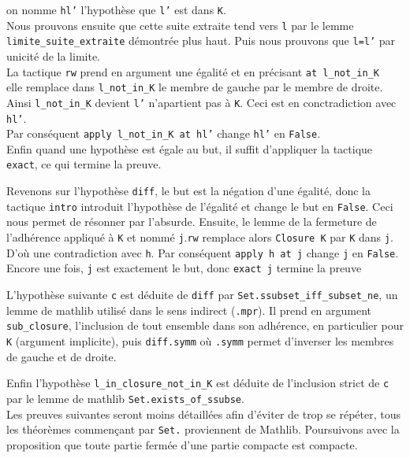 \documentclass[a4paper, 12pt]{article}
\newcommand{\lean}[1]{\texttt{#1}}
\begin{document}
\begin{itemize}[itemsep=30pt]
    on nomme \lean{hl'} l'hypothèse que \lean{l'} est dans \lean{K}.\\
    Nous prouvons ensuite que cette suite extraite tend vers \lean{l} par le lemme \lean{limite_suite_extraite} démontrée plus haut. Puis nous prouvons que \lean{l=l'} par unicité de la
    limite.\\
    La tactique \lean{rw} prend en argument une égalité et en précisant \lean{at l_not_in_K } elle remplace dans \lean{l_not_in_K} le membre de gauche par le membre de droite. Ainsi
    \lean{l_not_in_K} devient \lean{l'} n'apartient pas à \lean{K}. Ceci est en conctradiction avec \lean{hl'}.\\
    Par conséquent \lean{apply l_not_in_K at hl'} change \lean{hl'} en \lean{False}.\\
    Enfin quand une hypothèse est égale au but, il suffit d'appliquer la tactique \lean{exact}, ce qui termine la preuve.
\end{itemize}

\vspace{\baselineskip}
Revenons sur l'hypothèse \lean{diff}, le but est la négation d'une égalité, donc la tactique \lean{intro} introduit l'hypothèse de l'égalité et change le but en \lean{False}. Ceci nous permet de résonner par l'absurde. Ensuite, le lemme de la fermeture de l'adhérence appliqué à \lean{K} et nommé \lean{j}.\lean{rw} remplace alors \lean{Closure K} par \lean{K} dans \lean{j}. D'où une contradiction avec \lean{h}. Par conséquent \lean{apply h at j} change \lean{j} en \lean{False}. Encore une fois, \lean{j} est exactement le but, donc \lean{exact j} termine la preuve

L'hypothèse suivante \lean{c} est déduite de \lean{diff} par \lean{Set.ssubset_iff_subset_ne}, un lemme de mathlib utilisé dans le sens indirect (\lean{.mpr}). Il prend en argument \lean{sub_closure}, l'inclusion de tout ensemble dans son adhérence, en particulier pour \lean{K} (argument implicite), puis \lean{diff.symm} où \lean{.symm} permet d'inverser les membres de gauche et de droite.

Enfin l'hypothèse \lean{l_in_closure_not_in_K} est déduite de l'inclusion strict de \lean{c} par le lemme de mathlib \lean{Set.exists_of_ssubse}.\\


Les preuves suivantes seront moins détaillées afin d'éviter de trop se répéter, tous les théorèmes commençant par \lean{Set.} proviennent de Mathlib. Poursuivons avec la proposition que toute partie fermée d'une partie compacte est compacte.\\
\end{document}
